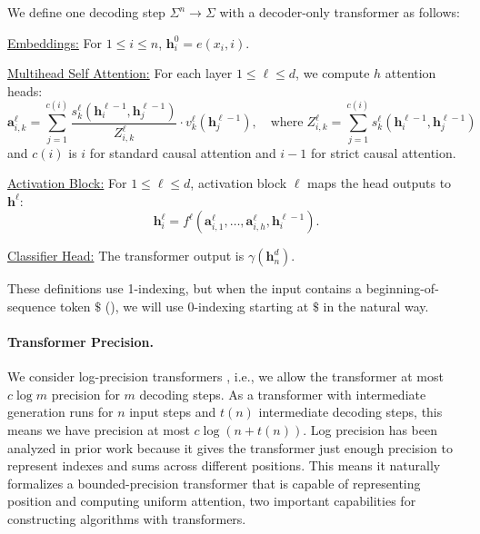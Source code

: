 \documentclass{article} %
\newcommand\change[1]{{\color{blue} #1}}
\newcommand\changeB[1]{{\color{purple} #1}}
\renewcommand\change[1]{#1}
\renewcommand\changeB[1]{#1}
\begin{document}
\begin{definition} \label{def:transformer-computation}
We define one decoding step $\Sigma^n \to \Sigma$ with a decoder-only transformer as follows:
\begin{compactenum}
    \item \underline{Embeddings:} For $1 \leq i \leq n$, $\mathbf h^0_i = e(x_i, i)$.
    \item \underline{Multihead Self Attention:} For each layer $1 \leq \ell \leq d$, we compute $h$ attention heads:
    \begin{equation*}
        \mathbf a^{\ell}_{i,k} = \sum_{j=1}^{c(i)} \frac{s^{\ell}_k(\mathbf h^{\ell-1}_i, \mathbf h^{\ell-1}_j)}{Z^\ell_{i,k}} \cdot v^{\ell}_k(\mathbf h^{\ell-1}_j) ,
        \quad \textrm{where} \;
        Z^\ell_{i,k} = \sum_{j=1}^{c(i)} s^{\ell}_k(\mathbf h^{\ell-1}_i, \mathbf h^{\ell-1}_j)
    \end{equation*}
    \change{and $c(i)$ is $i$ for standard causal attention and $i-1$ for strict causal attention.}

    \item \underline{Activation Block:} For $1 \leq \ell \leq d$, activation block $\ell$ maps the head outputs to $\mathbf h^\ell$:
    \begin{equation*}
        \mathbf h^{\ell}_i = f^{\ell}(\mathbf a^{\ell}_{i,1}, \ldots, \mathbf a^{\ell}_{i,h}, \mathbf h^{\ell-1}_i) .
    \end{equation*}
    \item \underline{Classifier Head:} The transformer output is $\gamma(\mathbf h^d_n)$.
\end{compactenum}
\end{definition}

\changeB{These definitions use 1-indexing, but when the input contains a beginning-of-sequence token $\$$ (\Cref{thm:automata,thm:lower-bound}), we will use 0-indexing starting at $\$$ in the natural way.}

\paragraph{Transformer Precision.} We consider log-precision transformers \citep{merrill2023parallelism}, i.e., we allow the transformer at most $c \log m$ precision for $m$ decoding steps. As a transformer with intermediate generation runs for $n$ input steps and $t(n)$ intermediate decoding steps, this means we have precision at most $c \log(n + t(n))$.
Log precision has been analyzed in prior work \citep{perez2021attention,merrill2023parallelism,merrill2023logic} because it gives the transformer just enough precision to represent indexes and sums across different positions. This means it naturally formalizes a bounded-precision transformer that is capable of representing position and computing uniform attention, two important capabilities for constructing algorithms with transformers.
\end{document}
